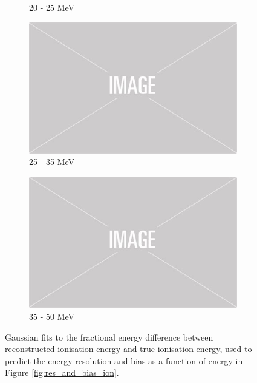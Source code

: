 \begin{figure}
\begin{subfigure}[b]{0.49\textwidth}
		\caption {20 - 25 MeV}
	\end{subfigure}
	\hfill
	\begin{subfigure}[b]{0.49\textwidth}
		\centering
		\includegraphics[width=\textwidth]{figures/placeholder.png}
		\caption {25 - 35 MeV}
	\end{subfigure}
	\begin{subfigure}[b]{0.49\textwidth}
		\centering
		\includegraphics[width=\textwidth]{figures/placeholder.png}
		\caption {35 - 50 MeV}
	\end{subfigure}

	\caption{Gaussian fits to the fractional energy difference between 
		reconstructed ionisation energy and true ionisation energy, used to predict 
		the energy resolution and bias as a function of energy in Figure 
		\ref{fig:res_and_bias_ion}.}
	\label{fig:ionisation_fits}

\end{figure}

